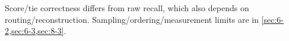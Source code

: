 Score/tie correctness differs from raw recall, which also depends on routing/reconstruction. Sampling/ordering/measurement limits are in \cref{sec:6-2,sec:6-3,sec:8-3}.